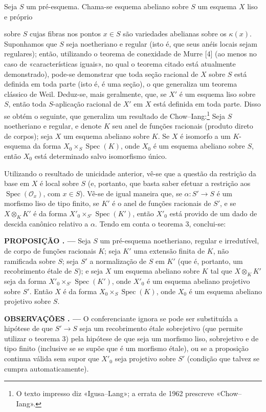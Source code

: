 \documentclass[11pt,twoside,openany]{book}
\numberwithin{equation}{section}
\newcommand{\src}[1]{%
  \phantomsection\hypertarget{src:#1}{}%
  \marginpar{\raggedleft\footnotesize\sffamily #1}%
}
\theoremstyle{plain}
\theoremstyle{definition}
\theoremstyle{remark}
\newcommand{\result}[2]{%
  \par\medskip\noindent\textbf{#1%
  \if\relax\detokenize{#2}\relax\else\space#2\fi. ---}\enspace
}
\newcommand{\FgaUnitKey}{frontmatter}
\renewcommand{\src}[1]{%
  \phantomsection\hypertarget{src:\FgaUnitKey:#1}{}%
  \marginpar{\raggedleft\footnotesize\sffamily #1}%
}
\begin{document}
Seja $S$ um pré-esquema. Chama-se esquema abeliano sobre $S$ um esquema $X$
liso e próprio

\src{324}
sobre $S$ cujas fibras nos pontos $x\in S$ são variedades abelianas sobre os
$\kappa(x)$. Suponhamos que $S$ seja noetheriano e regular
(isto é, que seus anéis locais sejam regulares); então, utilizando o
teorema de conexidade de Murre [4] (ao menos no caso de «características
iguais», no qual o teorema citado está atualmente demonstrado), pode-se
demonstrar que toda seção racional de $X$ sobre $S$ está definida em toda
parte (isto é, é uma seção), o que generaliza um teorema clássico de
Weil. Deduz-se, mais geralmente, que, se $X'$ é um esquema liso sobre $S$,
então toda $S$-aplicação racional de $X'$ em $X$ está definida em toda
parte. Disso se obtém o seguinte, que generaliza um resultado de
Chow--Iang:\footnote{O texto impresso diz «Igusa--Lang»; a errata de 1962
prescreve «Chow--Iang».} Seja $S$ noetheriano e regular, e denote $K$ seu
anel de funções racionais (produto direto de corpos); seja $X$ um
esquema abeliano sobre $K$. Se $X$ é isomorfo a um $K$-esquema da forma
$X_0\times_S\operatorname{Spec}(K)$, onde $X_0$ é um esquema abeliano sobre
$S$, então $X_0$ está determinado salvo isomorfismo único.

Utilizando o resultado de unicidade anterior, vê-se que a questão da
restrição da base em $X$ é local sobre $S$ (e, portanto, que basta saber
efetuar a restrição aos $\operatorname{Spec}(\mathcal O_x)$, com
$x\in S$). Vê-se de igual maneira que, se
$\alpha:S'\longrightarrow S$ é um morfismo liso de tipo finito, se $K'$ é o
anel de funções racionais de $S'$, e se $X\otimes_KK'$ é da forma
$X'_0\times_{S'}\operatorname{Spec}(K')$, então $X'_0$ está provido de um
dado de descida canônico relativo a $\alpha$. Tendo em conta o teorema 3,
conclui-se:

\result{PROPOSIÇÃO}{5.1} Seja $S$ um pré-esquema noetheriano, regular e
irredutível, de corpo de funções racionais $K$; seja $K'$ uma extensão
finita de $K$, não ramificada sobre $S$; seja $S'$ a normalização de $S$ em
$K'$ (que é, portanto, um recobrimento étale de $S$); e seja $X$ um esquema
abeliano sobre $K$ tal que $X\otimes_KK'$ seja da forma
$X'_0\times_{S'}\operatorname{Spec}(K')$, onde $X'_0$ é um esquema abeliano
projetivo sobre $S'$. Então $X$ é da forma
$X_0\times_S\operatorname{Spec}(K)$, onde $X_0$ é um esquema abeliano
projetivo sobre $S$.

\result{OBSERVAÇÕES}{} O conferenciante ignora se pode ser substituída a
hipótese de que $S'\longrightarrow S$ seja um recobrimento étale sobrejetivo
(que permite utilizar o teorema 3) pela hipótese de que seja um morfismo
liso, sobrejetivo e de tipo finito (inclusive se se supõe que é um morfismo
étale), ou se a proposição continua válida sem supor que $X'_0$ seja
projetivo sobre $S'$ (condição que talvez se cumpra automaticamente).
\end{document}
